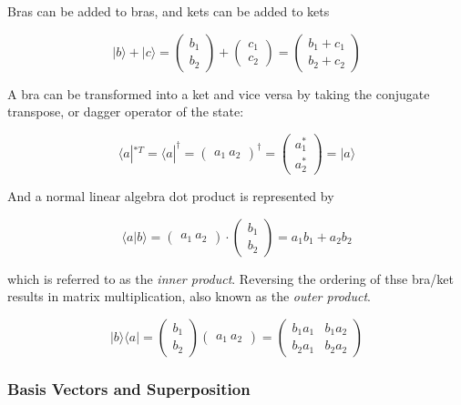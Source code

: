 \documentclass[11pt]{article}
\begin{document}
Bras can be added to bras, and kets can be added to kets

\[ | b \rangle + | c \rangle =  \begin{pmatrix} b_1 \\ b_2 \end{pmatrix} + \begin{pmatrix} c_1 \\ c_2 \end{pmatrix} = \begin{pmatrix} b_1 + c_1 \\ b_2 + c_2 \end{pmatrix}\]

A bra can be transformed into a ket and vice versa by taking the
conjugate transpose, or dagger operator of the state:

\[\langle a |^{*T} = \langle a |^\dagger = \begin{pmatrix} a_1 \ a_2 \end{pmatrix}^\dagger = \begin{pmatrix} a_1^* \\ a_2^* \end{pmatrix} = | a \rangle\]

And a normal linear algebra dot product is represented by

\[\langle a | b \rangle = \begin{pmatrix} a_1 \ a_2 \end{pmatrix} \cdot \begin{pmatrix} b_1 \\ b_2 \end{pmatrix} = a_1b_1 + a_2b_2\]

which is referred to as the \emph{inner product}. Reversing the ordering
of thse bra/ket results in matrix multiplication, also known as the
\emph{outer product}.

\[ | b \rangle \langle a | = \begin{pmatrix} b_1 \\ b_2 \end{pmatrix} \begin{pmatrix} a_1 \ a_2 \end{pmatrix}  = \begin{pmatrix} b_1a_1 & b_1a_2 \\ b_2a_1 & b_2a_2 \end{pmatrix} \]

    \subsubsection{Basis Vectors and
Superposition}\label{basis-vectors-and-superposition}
\end{document}
